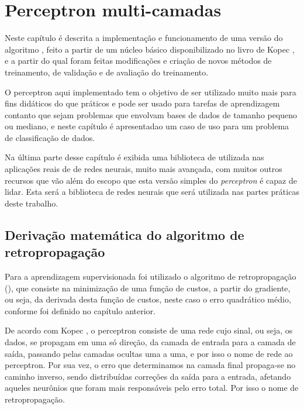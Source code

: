 
\chapter{Perceptron multi-camadas}
\label{cap:perceptron}

Neste capítulo é descrita a implementação e funcionamento de uma versão do algoritmo , feito a partir de um núcleo básico disponibilizado no livro de Kopec \citep{classic}, e a partir do qual foram feitas modificações e criação de novos métodos de treinamento, de validação e de avaliação do treinamento.

O perceptron aqui implementado tem o objetivo de ser utilizado muito mais para fins didáticos do que práticos e pode ser usado para tarefas de aprendizagem contanto que sejam problemas que envolvam bases de dados de tamanho pequeno ou mediano, e neste capítulo é apresentadao um caso de uso para um problema de classificação de dados.

Na última parte desse capítulo é exibida uma biblioteca de  utilizada nas aplicações reais de  de redes neurais, muito mais avançada, com muitos outros recursos que vão além do escopo que esta versão simples do \emph{perceptron} é capaz de lidar. Esta será a biblioteca de redes neurais que será utilizada nas partes práticas deste trabalho.

\section{Derivação matemática do algoritmo de retropropagação}

Para a aprendizagem supervisionada foi utilizado o algoritmo de retropropagação (), que consiste na minimização de uma função de custos, a partir do gradiente, ou seja, da derivada desta função de custos, neste caso o erro quadrático médio, conforme foi definido no capítulo anterior.

De acordo com Kopec \citep{classic}, o perceptron consiste de uma rede cujo sinal, ou seja, os dados, se propagam em uma só direção, da camada de entrada para a camada de saída, passando pelas camadas ocultas uma a uma, e por isso o nome de rede  ao perceptron. Por sua vez, o erro que determinamos na camada final propaga-se no caminho inverso, sendo distribuídas correções da saída para a entrada, afetando aqueles neurônios que foram mais responsáveis pelo erro total. Por isso o nome de retropropagação.

